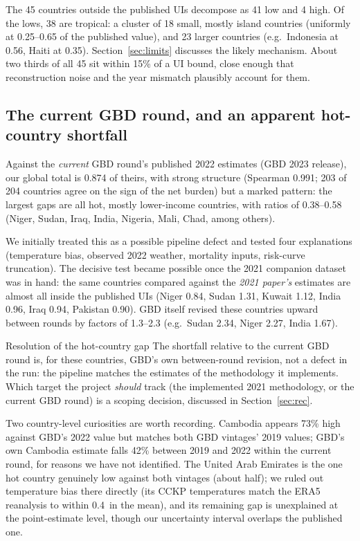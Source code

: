 \documentclass[11pt]{ozreport}
\begin{document}
The 45 countries outside the published UIs decompose as 41 low and 4 high.
Of the lows, 38 are tropical: a cluster of 18 small, mostly island countries
(uniformly at 0.25--0.65 of the published value), and 23 larger countries
(e.g.\ Indonesia at 0.56, Haiti at 0.35). Section~\ref{sec:limits} discusses
the likely mechanism. About two thirds of all 45 sit within 15\% of a UI
bound, close enough that reconstruction noise and the year mismatch
plausibly account for them.

\subsection{The current GBD round, and an apparent hot-country shortfall}

Against the \emph{current} GBD round's published 2022 estimates (GBD 2023
release), our global total is 0.874 of theirs, with strong structure
(Spearman 0.991; 203 of 204 countries agree on the sign of the net burden)
but a marked pattern: the largest gaps are all hot, mostly lower-income
countries, with ratios of 0.38--0.58 (Niger, Sudan, Iraq, India, Nigeria,
Mali, Chad, among others).

We initially treated this as a possible pipeline defect and tested four
explanations (temperature bias, observed 2022 weather, mortality inputs,
risk-curve truncation). The decisive test became possible once the 2021
companion dataset was in hand: the same countries compared against the
\emph{2021 paper's} estimates are almost all inside the published UIs
(Niger 0.84, Sudan 1.31, Kuwait 1.12, India 0.96, Iraq 0.94, Pakistan 0.90).
GBD itself revised these countries upward between rounds by factors of
1.3--2.3 (e.g.\ Sudan 2.34, Niger 2.27, India 1.67).

\begin{ozresult}{Resolution of the hot-country gap}
The shortfall relative to the current GBD round is, for these countries,
GBD's own between-round revision, not a defect in the run: the pipeline
matches the estimates of the methodology it implements. Which target the
project \emph{should} track (the implemented 2021 methodology, or the
current GBD round) is a scoping decision, discussed in
Section~\ref{sec:rec}.
\end{ozresult}

Two country-level curiosities are worth recording. Cambodia appears 73\%
high against GBD's 2022 value but matches both GBD vintages' 2019 values;
GBD's own Cambodia estimate falls 42\% between 2019 and 2022 within the
current round, for reasons we have not identified. The United Arab Emirates
is the one hot country genuinely low against both vintages (about half);
we ruled out temperature bias there directly (its CCKP temperatures match
the ERA5 reanalysis to within 0.4\,\textcelsius{} in the mean), and its
remaining gap is unexplained at the point-estimate level, though our
uncertainty interval overlaps the published one.
\end{document}
